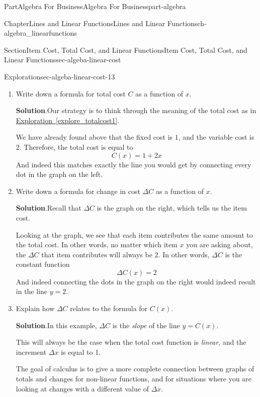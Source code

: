 \documentclass{tufte-book}
\newcommand{\blocktitlefont}{\relax}
\newcommand{\xreffont}{\relax}
\numberwithin{equation}{chapter}
\begin{document}
\begin{partptx}{Part}{Algebra For Business}{}{Algebra For Business}{}{}{part-algebra}
\begin{chapterptx}{Chapter}{Lines and Linear Functions}{}{Lines and Linear Functions}{}{}{ch-algebra_linearfunctions}
\begin{sectionptx}{Section}{Item Cost, Total Cost, and Linear Functions}{}{Item Cost, Total Cost, and Linear Functions}{}{}{sec-algeba-linear-cost}
\begin{exploration}{Exploration}{}{sec-algeba-linear-cost-13}
\begin{enumerate}[font=\bfseries,label=(\alph*),ref=\alph*]
\par
The graph on the right tells us the variable cost for each item.  As expected, the cost increases by 2\textdollar{} for each item, so the \emph{variable cost} is equal to 2.%
\item{}Write down a formula for total cost \(C\) as a function of \(x\).%
\par\smallskip%
\noindent\textbf{\blocktitlefont Solution}.\hypertarget{sec-algeba-linear-cost-13-3-2}{}\quad{}Our strategy is to think through the meaning of the total cost as in \hyperref[explore_totalcost1]{Exploration~{\xreffont\ref{explore_totalcost1}}}.%
\par
We have already found above that the fixed cost is \(1\), and the variable cost is \(2\).  Therefore, the total cost is equal to%
\begin{equation*}
C(x) = 1 + 2x
\end{equation*}
And indeed this matches exactly the line you would get by connecting every dot in the graph on the left.%
\item{}Write down a formula for change in cost \(\Delta C\) as a function of \(x\).%
\par\smallskip%
\noindent\textbf{\blocktitlefont Solution}.\hypertarget{sec-algeba-linear-cost-13-4-2}{}\quad{}Recall that \(\Delta C\) is the graph on the right, which tells us the item cost.%
\par
Looking at the graph, we see that each item contributes the same amount to the total cost.  In other words, no matter which item \(x\) you are asking about, the \(\Delta C\) that item contributes will always be \(2\). In other words, \(\Delta C\) is the constant function%
\begin{equation*}
\Delta C(x) = 2
\end{equation*}
And indeed connecting the dots in the graph on the right would indeed result in the line \(y=2\).%
\item{}Explain how \(\Delta C\) relates to the formula for \(C(x)\).%
\par\smallskip%
\noindent\textbf{\blocktitlefont Solution}.\hypertarget{sec-algeba-linear-cost-13-5-2}{}\quad{}In this example, \(\Delta C\) is the \emph{slope} of the line \(y=C(x)\).%
\par
This will always be the case when the total cost function is \emph{linear}, and the increment \(\Delta x\) is equal to 1.%
\par
The goal of calculus is to give a more complete connection between graphs of totals and changes for non-linear functions, and for situations where you are looking at changes with a different value of \(\Delta x\).%

\end{enumerate}
\end{exploration}
\end{sectionptx}
\end{chapterptx}
\end{partptx}
\end{document}
